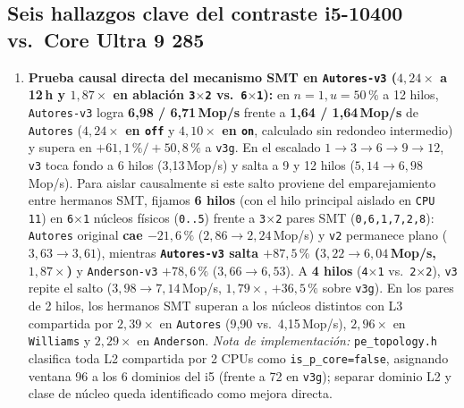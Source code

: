 \documentclass[11pt,a4paper]{article}
\begin{document}
\subsection{Seis hallazgos clave del contraste i5-10400 vs.\ Core Ultra 9 285}

\begin{enumerate}
  \item \textbf{Prueba causal directa del mecanismo SMT en \texttt{Autores-v3} ($4{,}24\times$ a 12\,h y $1{,}87\times$ en ablación \texttt{3$\times$2} vs.\ \texttt{6$\times$1}):} en $n=1, u=50\,\%$ a 12 hilos, \texttt{Autores-v3} logra \textbf{6{,}98 / 6{,}71\,Mop/s} frente a \textbf{1{,}64 / 1{,}64\,Mop/s} de \texttt{Autores} (\textbf{$4{,}24\times$ en \texttt{off}} y \textbf{$4{,}10\times$ en \texttt{on}}, calculado sin redondeo intermedio) y supera en $+61{,}1\,\% / +50{,}8\,\%$ a \texttt{v3g}. En el escalado $1 \to 3 \to 6 \to 9 \to 12$, \texttt{v3} toca fondo a 6 hilos (3{,}13\,Mop/s) y salta a 9 y 12 hilos ($5{,}14 \to 6{,}98$\,Mop/s). Para aislar causalmente si este salto proviene del emparejamiento entre hermanos SMT, fijamos \textbf{6 hilos} (con el hilo principal aislado en \texttt{CPU 11}) en \texttt{6$\times$1} núcleos físicos (\texttt{0..5}) frente a \texttt{3$\times$2} pares SMT (\texttt{0,6,1,7,2,8}): \texttt{Autores} original \textbf{cae $-21{,}6\,\%$} ($2{,}86 \to 2{,}24$\,Mop/s) y \texttt{v2} permanece plano ($3{,}63 \to 3{,}61$), mientras \textbf{\texttt{Autores-v3} salta $+87{,}5\,\%$ ($3{,}22 \to 6{,}04$\,Mop/s, $1{,}87\times$)} y \texttt{Anderson-v3} $+78{,}6\,\%$ ($3{,}66 \to 6{,}53$). A \textbf{4 hilos} (\texttt{4$\times$1} vs.\ \texttt{2$\times$2}), \texttt{v3} repite el salto ($3{,}98 \to 7{,}14$\,Mop/s, $1{,}79\times$, $+36{,}5\,\%$ sobre \texttt{v3g}). En los pares de 2 hilos, los hermanos SMT superan a los núcleos distintos con L3 compartida por \textbf{$2{,}39\times$} en \texttt{Autores} (9{,}90 vs.\ 4{,}15\,Mop/s), $2{,}96\times$ en \texttt{Williams} y $2{,}29\times$ en \texttt{Anderson}. \emph{Nota de implementación:} \texttt{pe\_topology.h} clasifica toda L2 compartida por 2 CPUs como \texttt{is\_p\_core=false}, asignando ventana 96 a los 6 dominios del i5 (frente a 72 en \texttt{v3g}); separar dominio L2 y clase de núcleo queda identificado como mejora directa.


\end{enumerate}
\end{document}
